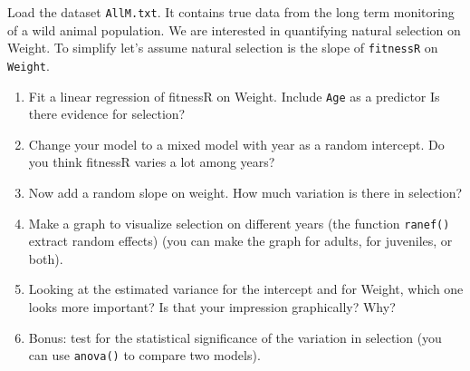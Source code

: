 \documentclass[12pt,a4paper]{scrartcl}\usepackage[]{graphicx}\usepackage[]{color}
\begin{document}
\begin{Exercise}[difficulty=2, title={Does natural selection vary?}]
Load the dataset \texttt{AllM.txt}. It contains true data from the long term monitoring of a wild animal population. We are interested in quantifying natural selection on Weight. To simplify let's assume natural selection is the slope of \texttt{fitnessR} on \texttt{Weight}. 
\begin{enumerate}
  \item Fit a linear regression of fitnessR on Weight. Include \texttt{Age} as a predictor Is there evidence for selection?
  \item Change your model to a mixed model with year as a random intercept. Do you think fitnessR varies a lot among years?
  \item Now add a random slope on weight. How much variation is there in selection?
  \item Make a graph to visualize selection on different years (the function \texttt{ranef()} extract random effects) (you can make the graph for adults, for juveniles, or both).
  \item Looking at the estimated variance for the intercept and for Weight, which one looks more important? Is that your impression graphically? Why?
  \item Bonus: test for the statistical significance of the variation in selection (you can use \texttt{anova()} to compare two models).
\end{enumerate}
\end{Exercise}
\end{document}
